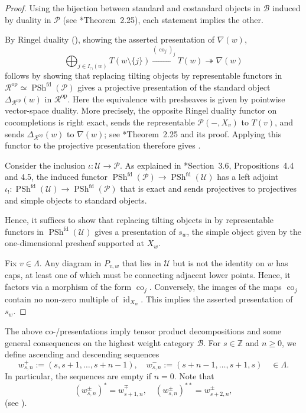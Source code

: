 \documentclass[11pt,oneside]{amsart}
\theoremstyle{definition}
\theoremstyle{remark}
\newcommand\cB{\mathcal B}
\newcommand\cP{\mathcal P}
\newcommand\cR{\mathcal R}
\newcommand\cU{\mathcal U}
\newcommand\ZZ{\mathbb Z}
\newcommand\id{\operatorname{id}}
\newcommand\co{\operatorname{co}}
\newcommand\PSh{\operatorname{PSh}}
\renewcommand\:\colon
\newcommand\op{^{\mathrm{op}}}
\newcommand\fd{^{\mathrm{fd}}}
\newcommand\tto{\twoheadrightarrow}
\begin{document}
\begin{proof}
Using the bijection between standard and costandard objects in $\cB$ induced by duality in $\cP$ (see \cite{FG}*{Theorem~2.25}), each statement implies the other.

By Ringel duality (), showing the asserted presentation of $\nabla(w)$, 
\begin{equation}
\bigoplus_{j\in I_\cap(w)} T(w\setminus\{j\}) 
\xrightarrow{(\co_j)_j} 
T(w) 
\tto \nabla(w)
\label{eq:pres}
\end{equation}
follows by showing that replacing tilting objects by representable functors in $\cR\op\simeq\PSh\fd(\cP)$ gives a projective presentation of the standard object $\Delta_{\cR\op}(w)$ in $\cR\op$. Here the equivalence with presheaves is given by pointwise vector-space duality. More precisely, the opposite Ringel duality functor on cocompletions is right exact, sends the representable $\cP(-,X_v)$ to $T(v)$, and sends $\Delta_{\cR\op}(w)$ to $\nabla(w)$; see \cite{FG}*{Theorem~2.25 and its proof}. Applying this functor to the projective presentation therefore gives .

Consider the inclusion $\iota\:\cU\to\cP$. As explained in \cite{SS}*{Section~3.6, Propositions~4.4 and 4.5}, the induced functor $\PSh\fd(\cP)\to\PSh\fd(\cU)$ has a left adjoint $\iota_!\:\PSh\fd(\cU)\to\PSh\fd(\cP)$ that is exact and sends projectives to projectives and simple objects to standard objects.

Hence, it suffices to show that replacing tilting objects in  by representable functors in $\PSh\fd(\cU)$ gives a presentation of $s_w$, the simple object given by the one-dimensional presheaf supported at $X_w$.

Fix $v\in\Lambda$. Any diagram in $P_{v,w}$ that lies in $\cU$ but is not the identity on $w$ has caps, at least one of which must be connecting adjacent lower points. Hence, it factors via a morphism of the form $\co_j$. Conversely, the images of the maps $\co_j$ contain no non-zero multiple of $\id_{X_w}$. This implies the asserted presentation of $s_w$. 
\end{proof}


The above co-/presentations imply tensor product decompositions and some general consequences on the highest weight category $\cB$. For $s\in\ZZ$ and $n\ge0$, we define ascending and descending sequences 
$$
w^+_{s,n}:=(s,s+1,\dots,s+n-1) ,\quad
w^-_{s,n}:=(s+n-1,\dots,s+1,s)
\quad\in\Lambda .
$$
In particular, the sequences are empty if $n=0$. Note that 
$$
(w^\pm_{s,n})^*=w^\mp_{s+1,n} ,\quad (w^\pm_{s,n})^{**}=w^\pm_{s+2,n} , $$
(see ).
\end{document}
